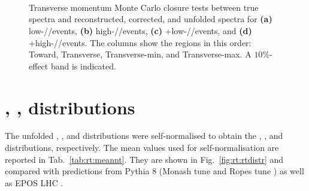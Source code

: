 \begin{figure}[H]%
\def \PID {K0s}
\\
\\
\def \PID {L}%
\\
\caption{Transverse momentum Monte Carlo closure tests between true spectra and reconstructed, corrected, and unfolded spectra for \textbf{(a)} \KOs low-\RT/\RTmin/\RTmax events, \textbf{(b)} \KOs high-\RT/\RTmin/\RTmax events, \textbf{(c)} \LA+\AL low-\RT/\RTmin/\RTmax events, and \textbf{(d)} \LA+\AL high-\RT/\RTmin/\RTmax events. The columns show the regions in this order: Toward, Transverse, Transverse-min, and Transverse-max. A $10\%$-effect band is indicated.}
\label{fig:rt:closures}
\end{figure}


\section{\RT, \RTmin, \RTmax distributions}

The unfolded \NT, \NTmin, and \NTmax distributions were self-normalised to obtain the \RT, \RTmin, and \RTmax distributions, respectively. The mean values used for self-normalisation are reported in Tab.~\ref{tab:rt:meannt}. They are shown in Fig.~\ref{fig:rt:rtdistr} and compared with predictions from Pythia 8 (Monash tune \cite{skandsTuningPYTHIAMonash2014} and Ropes tune \cite{bierlichEffectsOverlappingStrings2015}) as well as EPOS LHC \cite{pierogEPOSLHCTest2015}. 

